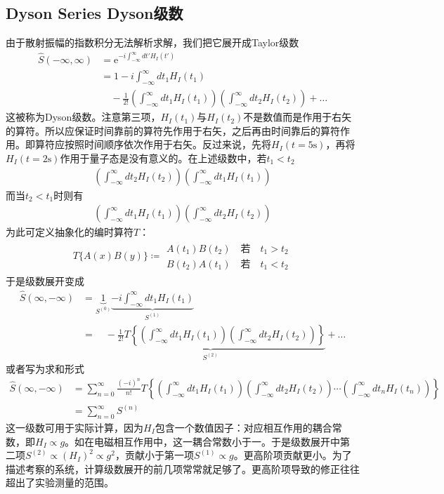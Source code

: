 \subsection{Dyson Series Dyson级数}\label{sec9.5.3}
由于散射振幅的指数积分无法解析求解，我们把它展开成Taylor级数
\begin{align}\label{equ9.67}
\hat{S}(-\infty,\infty)&=\text{e}^{-i\int_{-\infty}^\infty dt' H_I(t')}\nonumber\\
&=1-i\int_{-\infty}^\infty dt_1 H_I(t_1)\nonumber\\
&\quad-\frac{1}{2!}\left(\int_{-\infty}^{\infty}dt_1 H_I(t_1)\right)\left(\int_{-\infty}^{\infty}dt_2 H_I(t_2)\right)+\ldots
\end{align}
这被称为Dyson级数。注意第三项，$H_I(t_1)$与$H_I(t_2)$不是数值而是作用于右矢的算符。所以应保证时间靠前的算符先作用于右矢，之后再由时间靠后的算符作用。即算符应按照时间顺序依次作用于右矢。反过来说，先将$H_I(t=5\text{s})$，再将$H_I(t=2\text{s})$作用于量子态是没有意义的。在上述级数中，若$t_1<t_2$
\begin{gather*}
\left(\int_{-\infty}^{\infty}dt_2 H_I(t_2)\right)\left(\int_{-\infty}^{\infty}dt_1 H_I(t_1)\right)
\end{gather*}
而当$t_2<t_1$时则有
\begin{gather*}
\left(\int_{-\infty}^{\infty}dt_1 H_I(t_1)\right)\left(\int_{-\infty}^{\infty}dt_2 H_I(t_2)\right)
\end{gather*}
为此可定义抽象化的编时算符$T$：
\begin{align}\label{equ9.68}
T\{A(x)B(y)\}\coloneqq\begin{array}{c}A(t_1)B(t_2)\quad\text{若}\quad t_1>t_2\\B(t_2)A(t_1)\quad\text{若}\quad t_1<t_2\end{array}
\end{align}
于是级数展开变成
\begin{align}\label{equ9.69}
\hat{S}(\infty,-\infty)&=\underbrace{1}_{S^{(0)}}\underbrace{-i\int_{-\infty}^{\infty}dt_1H_I(t_1)}_{S^(1)}\nonumber\\
&=\underbrace{\quad-\frac{1}{2!}T\left\{\left(\int_{-\infty}^{\infty}dt_1 H_I(t_1)\right)\left(\int_{-\infty}^{\infty}dt_2 H_I(t_2)\right)\right\}}_{S^{(2)}}+\ldots
\end{align}
或者写为求和形式
\begin{align}\label{equ9.70}
\hat{S}(\infty,-\infty)&=\sum_{n=0}^\infty\frac{(-i)^n}{n!}T\left\{\left(\int_{-\infty}^{\infty}dt_1 H_I(t_1)\right)\left(\int_{-\infty}^{\infty}dt_2 H_I(t_2)\right)\cdots\left(\int_{-\infty}^{\infty}dt_n H_I(t_n)\right)\right\}\nonumber\\
&=\sum_{n=0}^\infty S^{(n)}
\end{align}
这一级数可用于实际计算，因为$H_I$包含一个数值因子：对应相互作用的耦合常数，即$H_I\propto g$。如在电磁相互作用中，这一耦合常数小于一。于是级数展开中第二项$S^{(2)}\propto(H_I)^2\propto g^2$，贡献小于第一项$S^{(1)}\propto g$。更高阶项贡献更小。为了描述考察的系统，计算级数展开的前几项常常就足够了。更高阶项导致的修正往往超出了实验测量的范围。

